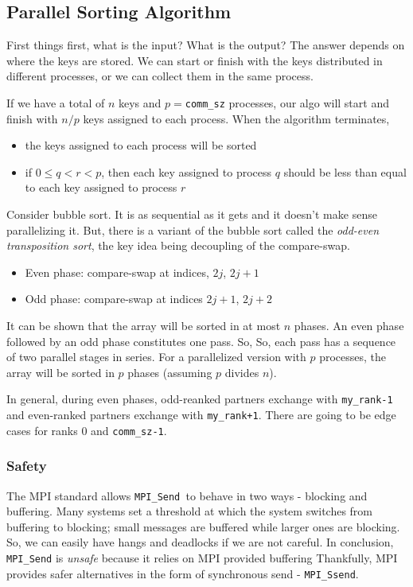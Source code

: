 \documentclass[a4paper]{article}
\begin{document}
\subsection*{Parallel Sorting Algorithm}
First things first, what is the input? What is the output? The answer
depends on where the keys are stored. We can start or finish with
the keys distributed in different processes, or we can collect them
in the same process.

If we have a total of $n$ keys and $p = $\texttt{comm\_sz} processes,
our algo will start and finish with $n/p$ keys assigned to each process.
When the algorithm terminates, 
\begin{itemize}
	\item  the keys assigned to each process
		will be sorted
	\item if $0\le q < r < p$, then each key assigned to process
		$q$ should be less than equal to each key assigned
		to process $r$
\end{itemize}

Consider bubble sort. It is as sequential as it gets and it doesn't
make sense parallelizing it. But, there is a variant of the bubble
sort called the \emph{odd-even transposition sort}, the key idea
being decoupling of the compare-swap.
\begin{itemize}
	\item Even phase: compare-swap at indices, $2j$, $2j+1$ 
	\item Odd phase: compare-swap at indices $2j+1$, $2j+2$
\end{itemize}
It can be shown that the array will be sorted in at most $n$ phases.
An even phase followed by an odd phase constitutes one pass. So,
So, each pass has a sequence of two parallel stages in series.
For a parallelized version with $p$ processes, the array will be 
sorted in $p$ phases (assuming $p$  divides $n$).

In general, during even phases, odd-reanked partners exchange with
 \texttt{my\_rank-1} and even-ranked partners exchange with
 \texttt{my\_rank+1}. There are going to be edge cases for 
 ranks 0 and  \texttt{comm\_sz-1}.

\subsubsection*{Safety}
The MPI standard allows \texttt{MPI\_Send }to behave in two ways - blocking
and buffering. Many systems set a threshold at which the system
switches from buffering to blocking; small messages are buffered
while larger ones are blocking. So, we can easily have hangs
and deadlocks if we are not careful. In conclusion, \texttt{MPI\_Send} is \emph{unsafe} 
because it relies on MPI provided buffering  Thankfully, MPI
provides safer alternatives in the form of synchronous send - \texttt{MPI\_Ssend}.
\end{document}
